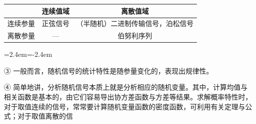 \documentclass[11pt,openany,UTF8]{ctexbook}
\newenvironment{citemize}
  {\begin{list}{}{\leftmargin=2.4em\itemindent=-2.4em\itemsep=1pt\topsep=3pt\parsep=0pt}}
  {\end{list}}
\begin{document}
\begin{center}
  \label{tab:2.2}

  \small
  \setlength{\tabcolsep}{6pt}
  \begin{tabular}{|c|c|c|}
    \hline
     & 连续值域 & 离散值域\\
    \hline
    连续参量 & 正弦信号 & （半随机\nobreak）二进制传输信号\nobreak，泊松信号\\
    \hline
    离散参量 & — & 伯努利序列\\
    \hline
  \end{tabular}
\end{center}

\begin{citemize}
\item ③ 一般而言\nobreak，随机信号的统计特性是随参量变化的\nobreak，表现出规律性\nobreak。
\item ④ 简单地讲\nobreak，分析随机信号本质上就是分析相应的随机变量\nobreak。其中\nobreak，计算均值与相关函数是基本的\nobreak，由它们容易导出协方差函数与方差等结果\nobreak。求解概率特性时\nobreak，对于取值连续的信号\nobreak，常常要计算随机变量函数的密度函数\nobreak，可利用有关定理与公式\nobreak；对于取值离散的信

\end{citemize}
\end{document}
